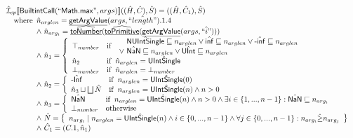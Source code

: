 \documentclass{article}
\newcommand{\SF}[1]{\mbox{\textsf{#1}}}
\newcommand{\wherec}[1]{{\rm where}\begin{array}[t]{l}#1\end{array}}
\newcommand{\ifc}[1]{{\rm if}\begin{array}[t]{l}#1\end{array}}
\newcommand{\owc}{{\rm otherwise}}
\newcommand{\aI}{\hat{\mathcal{I}}}
\newcommand{\set}[1]{\left\{\begin{array}{l}#1\end{array}\right\}}
\newcommand{\lbr}{\llbracket}
\newcommand{\rbr}{\rrbracket}
\newcommand{\hf}[1]{\underline{\sf #1}}
\newcommand{\ahf}[1]{\widehat{\underline{\sf #1}}}
\begin{document}
\[
\begin{array}{ll}

\aI _{cp}\lbr \SF{BuiltintCall}(``\SF{Math.max}",args)\rbr((\hat{H},\hat{C}), \hat{S})
  = ((\hat{H}, \hat{C}_1), \hat{S})\\
\quad\wherec{
  \hat{n}_{arglen} = \hf{getArgValue}(args, \hat{``length"}).1.4\\
  \land\ \hat{n}_{arg_i} = \ahf{toNumber}(\ahf{toPrimitive}(\hf{getArgValue}(args, \hat{``i"})))\\
  \land\ \hat{n}_1 = \left\{\begin{array}{ll}
      \top_{number} & \ifc{\begin{array}{l}
          \quad \hat{\SF{NUIntSingle}} \sqsubseteq n_{arglen} \lor \hat{\SF{inf}} \sqsubseteq n_{arglen}        
          \lor \hat{\SF{-inf}} \sqsubseteq n_{arglen}\\
          \lor\ \hat{\SF{NaN}} \sqsubseteq n_{arglen} \lor \hat{\SF{UInt}} \sqsubseteq n_{arglen}
        \end{array}}\\
      \hat{n}_2 & \ifc{\hat{n}_{arglen} = \hat{\SF{UIntSingle}}}\\
      \bot_{number} &  \ifc{\hat{n}_{arglen} = \bot_{number}}\\
    \end{array}\right.\\
  \land\ \hat{n}_2 = \left\{\begin{array}{ll}
      \hat{\SF{-Inf}} & \ifc{n_{arglen} = \hat{\SF{UIntSingle}}(0)}\\
      \hat{n}_3 \sqcup \bigsqcup \hat{N}& \ifc{n_{arglen} = \hat{\SF{UIntSingle}}(n) \land n > 0}\\
    \end{array}\right.\\
  \land\ \hat{n}_3 = \left\{\begin{array}{ll}
      \hat{\SF{NaN}}
      & \ifc{n_{arglen} = \hat{\SF{UIntSingle}}(n)
        \land n > 0 \land \exists i \in \{1,..., n-1\}: \hat{\SF{NaN}} \sqsubseteq {n}_{arg_i}}\\
      \bot_{number} & \owc
    \end{array}\right.\\
  \land\ \hat{N} = \set{{n}_{arg_i} \mid n_{arglen} = \hat{\SF{UIntSingle}}(n)
    \land i \in \{0,...,n-1\} \land \forall j \in \{0,...,n-1\}: {n}_{arg_i} \hat{\geq} {n}_{arg_j}}\\
  \land\ \hat{C}_1 = (C.1, \hat{n}_1)
  }\\
\\\\

\end{array}\]
\end{document}
